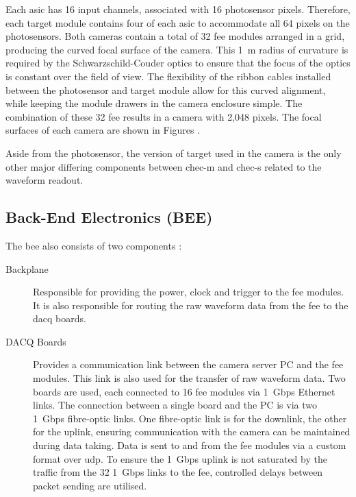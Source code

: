 Each \gls{asic} has 16 input channels, associated with 16 photosensor pixels. Therefore, each \gls{target} module contains four of each \gls{asic} to accommodate all 64 pixels on the photosensors. Both cameras contain a total of 32 \gls{fee} modules arranged in a grid, producing the curved focal surface of the camera. This \SI{1}{m} radius of curvature is required by the Schwarzschild-Couder optics to ensure that the focus of the optics is constant over the field of view. The flexibility of the ribbon cables installed between the photosensor and \gls{target} module allow for this curved alignment, while keeping the module drawers in the camera enclosure simple. The combination of these 32 \gls{fee} results in a camera with 2,048 pixels. The focal surfaces of each camera are shown in Figures .

Aside from the photosensor, the version of \gls{target} used in the camera is the only other major differing components between \gls{chec-m} and \gls{chec-s} related to the waveform readout. 

\subsection{Back-End Electronics (BEE)} \label{section:bee}

The \gls{bee} also consists of two components \cite{Zorn2017}:
\begin{description}
\item [Backplane] Responsible for providing the power, clock and trigger to the \gls{fee} modules. It is also responsible for routing the raw waveform data from the \gls{fee} to the \gls{dacq} boards. 
\item [DACQ Boards] Provides a communication link between the camera server PC and the \gls{fee} modules. This link is also used for the transfer of raw waveform data. Two boards are used, each connected to 16 \gls{fee} modules via \SI{1}{Gbps} Ethernet links. The connection between a single board and the PC is via two \SI{1}{Gbps} fibre-optic links. One fibre-optic link is for the downlink, the other for the uplink, ensuring communication with the camera can be maintained during data taking. Data is sent to and from the \gls{fee} modules via a custom format over \gls{udp}. To ensure the \SI{1}{Gbps} uplink is not saturated by the traffic from the 32 \SI{1}{Gbps} links to the \gls{fee}, controlled delays between packet sending are utilised.
\end{description}

